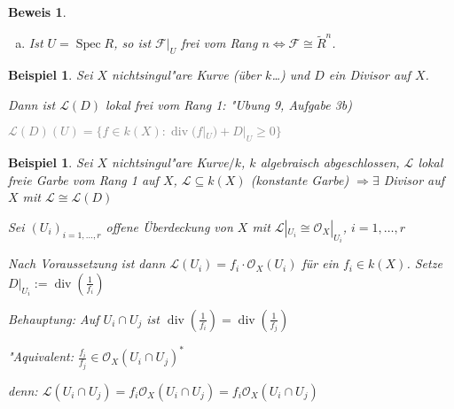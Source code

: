 \documentclass[paper = A4, fontsize=12pt, numbers=noendperiod, chapterprefix=true]{scrbook}
\theoremstyle{break}
\newtheorem{Bsp}[Def]{Beispiel}
\theoremstyle{nonumberbreak}
\newtheorem{bsp}{Beispiel}
\newtheorem{bew}{Beweis}
\theoremstyle{nonumberplain}
\DeclareMathOperator{\Spec}{Spec}
\DeclareMathOperator{\ddiv}{div}
\newcommand{\calF}{\mathcal{F}}
\newcommand{\calL}{\mathcal{L}}
\newcommand{\calO}{\mathcal{O}}
\begin{document}
\begin{bew}\begin{enumerate}[a)]\item[c)]
Ist $U = \Spec R$, so ist $\calF|_U$ frei vom Rang $ n \Leftrightarrow\calF \cong \tilde R^n$.
\end{enumerate}\end{bew}

\begin{Bsp}
Sei $X$ nichtsingul"are Kurve (\"uber $k$\ldots) und $D$ ein Divisor auf $X$.

Dann ist $\calL(D)$ lokal frei vom Rang 1: "Ubung 9, Aufgabe 3b)

\textcolor{gray}{$\calL(D)(U) = \{ f \in k(X): \ddiv(f|_U) + D|_U \ge 0 \}$}
\end{Bsp}

\begin{bsp}
Sei $X$ nichtsingul"are Kurve$/k$, $k$ algebraisch abgeschlossen, $\calL$ lokal freie Garbe vom Rang 1 auf $X$, $\calL \subseteq k(X)$ (konstante Garbe) $\Rightarrow \exists$ Divisor auf $X$ mit $\calL \cong \calL(D)$
\begin{description}[\setlabelstyle{\itshape}]\item[Denn:]
Sei $(U_i)_{i = 1,\ldots ,r}$ offene \"Uberdeckung von $X$ mit $\calL|_{U_i} \cong \calO_X|_{U_i}$, $i=1,\ldots ,r$

Nach Voraussetzung ist dann $\calL(U_i) = f_i \cdot \calO_X(U_i)$ f\"ur ein $f_i \in k(X)$. Setze $D|_{U_i} := \ddiv(\frac{1}{f_i})$

\emph{Behauptung:} Auf $U_i \cap U_j$ ist $\ddiv(\frac{1}{f_i}) = \ddiv(\frac{1}{f_j})$

"Aquivalent: $\frac{f_i}{f_j} \in \calO_X(U_i \cap U_j)^*$

\emph{denn:} $\calL(U_i \cap U_j) = f_i\calO_X(U_i \cap U_j) = f_i \calO_X(U_i \cap U_j)$
\end{description}\end{bsp}
\end{document}
